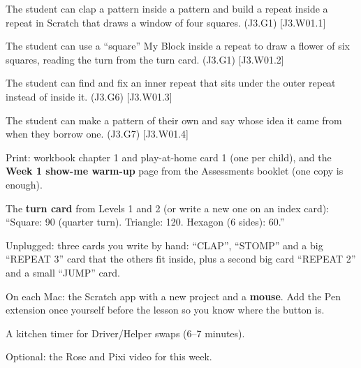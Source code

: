 
\begin{objectives}
  \item The student can clap a pattern inside a pattern and build a repeat inside a repeat in Scratch that draws a window of four squares. (J3.G1) [J3.W01.1]
  \item The student can use a \enquote{square} My Block inside a repeat to draw a flower of six squares, reading the turn from the turn card. (J3.G1) [J3.W01.2]
  \item The student can find and fix an inner repeat that sits under the outer repeat instead of inside it. (J3.G6) [J3.W01.3]
  \item The student can make a pattern of their own and say whose idea it came from when they borrow one. (J3.G7) [J3.W01.4]
\end{objectives}

\begin{materials}
  \item Print: workbook chapter 1 and play-at-home card 1 (one per child), and the \textbf{Week 1 show-me warm-up} page from the Assessments booklet (one copy is enough).
  \item The \textbf{turn card} from Levels 1 and 2 (or write a new one on an index card): \enquote{Square: 90 (quarter turn). Triangle: 120. Hexagon (6 sides): 60.}
  \item Unplugged: three cards you write by hand: \enquote{CLAP}, \enquote{STOMP} and a big \enquote{REPEAT 3} card that the others fit inside, plus a second big card \enquote{REPEAT 2} and a small \enquote{JUMP} card.
  \item On each Mac: the Scratch app with a new project and a \textbf{mouse}. Add the Pen extension once yourself before the lesson so you know where the button is.
  \item A kitchen timer for Driver/Helper swaps (6--7 minutes).
  \item Optional: the Rose and Pixi video for this week.
\end{materials}

